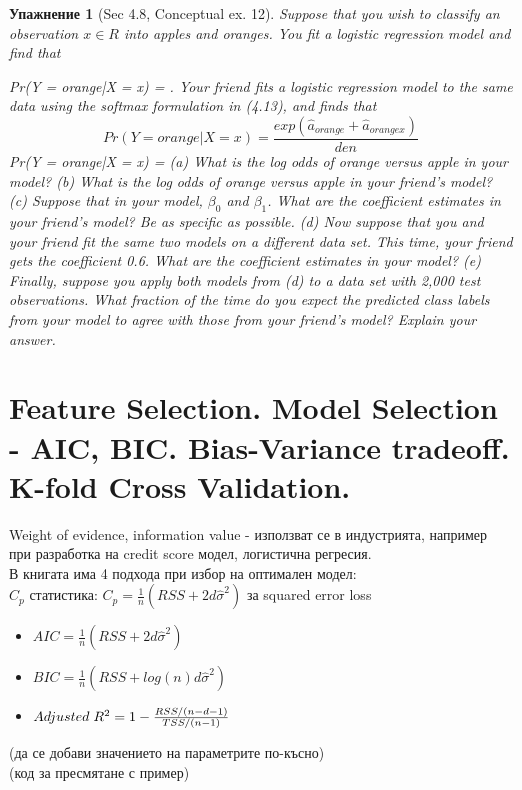\documentclass{article}
\newtheorem{exercise}[subsubsection]{Упажнение}
\begin{document}
	\begin{exercise}[Sec 4.8, Conceptual ex. 12]
	Suppose that you wish to classify an observation $x \in R $ into apples
	and oranges. You fit a logistic regression model and find that
	
	Pr(Y = orange|X = x) =
	.
	Your friend fits a logistic regression model to the same data using the
	softmax formulation in (4.13), and finds that
	$$Pr(Y= orange| X=x) = \frac{exp(\hat{a}_{orange} + \hat{a}_{orangex}) }{den}$$
	Pr(Y = orange|X = x) =
	(a) What is the log odds of orange versus apple in your model?
	(b) What is the log odds of orange versus apple in your friend’s
	model?
	(c) Suppose that in your model, $\beta_0$ and $\beta_1$. What are
	the coefficient estimates in your friend’s model? Be as specific
	as possible.
	(d) Now suppose that you and your friend fit the same two models
	on a different data set. This time, your friend gets the coefficient
	0.6. What are the coefficient estimates in your model?
	(e) Finally, suppose you apply both models from (d) to a data set
	with 2,000 test observations. What fraction of the time do you
	expect the predicted class labels from your model to agree with
	those from your friend’s model? Explain your answer. \\
	\end{exercise}


	
	
	
	\newpage
	\section{Feature Selection. Model Selection - AIC, BIC. Bias-Variance tradeoff. K-fold Cross Validation.} 
	Weight of evidence, information value - използват се в индустрията, например при разработка на credit score модел, логистична регресия. \\
	В книгата има 4 подхода при избор на оптимален модел: \\
	$C_p$ статистика: $C_p = \frac{1}{n}(RSS + 2d \hat \sigma^2)$ за squared error loss
	\begin{itemize}
		\item $AIC = \frac{1}{n}(RSS + 2d \hat \sigma^2)$
		\item $BIC = \frac{1}{n}(RSS + log(n) d \hat \sigma^2)$
		\item $Adjusted \hspace{0.1cm} R^2 = 1 - \frac{RSS/(n-d-1)}{TSS/(n-1)} $
	\end{itemize}
	(да се добави значението на параметрите по-късно) \\
	(код за пресмятане с пример) \\
	
\end{document}

